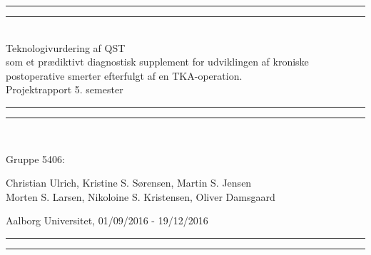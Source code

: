 \clearpage
\thispagestyle{empty}

\begin{center}
	\vspace*{\baselineskip}
	\rule{\textwidth}{1.6pt}\vspace*{-\baselineskip}\vspace*{2pt} %
	\rule{\textwidth}{0.4pt}\\[\baselineskip] %
	
	{\huge Teknologivurdering af QST \\\hspace*{2ex} som et prædiktivt diagnostisk supplement for udviklingen af kroniske postoperative smerter efterfulgt af en TKA-operation.\\[0.5\baselineskip] \large Projektrapport 5. semester}\\[0.2\baselineskip] %
	
	\rule{\textwidth}{0.4pt}\vspace*{-\baselineskip}\vspace{3.2pt} %
	\rule{\textwidth}{1.6pt}\\[\baselineskip] %
	\vspace*{5\baselineskip}
	\vspace*{\fill}
	\scshape %
	{\Large Gruppe 5406:\par}
	Christian Ulrich, Kristine S. Sørensen, Martin S. Jensen \\
	Morten S. Larsen, Nikoloine S. Kristensen, Oliver Damsgaard
	
	\vspace*{.2\baselineskip} %
	Aalborg Universitet,  01/09/2016 - 19/12/2016 \par %
\end{center} %
\begin{center}
	\rule{\textwidth}{0.4pt}\vspace*{-\baselineskip}\vspace{3.2pt} %
	\rule{\textwidth}{1.6pt}\\[\baselineskip] %
\end{center}